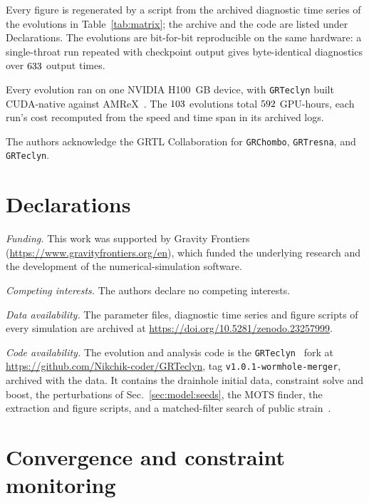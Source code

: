 \documentclass[twocolumn,floatfix,aps,prd,superscriptaddress,nofootinbib]{revtex4-2}
\makeatletter
\newcommand{\packfloatpages}{%
  \setlength{\@fptop}{0pt}%
  \setlength{\@fpsep}{12pt}%
  \setlength{\@fpbot}{0pt plus 1fil}%
  \setlength{\@dblfptop}{0pt}%
  \setlength{\@dblfpsep}{12pt}%
  \setlength{\@dblfpbot}{0pt plus 1fil}%
}
\makeatother
\begin{document}
Every figure is regenerated by a script from the archived diagnostic time series of the evolutions in Table~\ref{tab:matrix}; the archive and the code are listed under Declarations. The evolutions are bit-for-bit reproducible on the same hardware: a single-throat run repeated with checkpoint output gives byte-identical diagnostics over $633$ output times.

Every evolution ran on one NVIDIA H100 \clmDetMemDevice\,GB device, with \texttt{GRTeclyn} built CUDA-native against AMReX~\clmDetAmrexVersion. The $103$ evolutions total $592$ GPU-hours, each run's cost recomputed from the speed and time span in its archived logs.

\begin{acknowledgments}
The authors acknowledge the GRTL Collaboration for \texttt{GRChombo}, \texttt{GRTresna},
and \texttt{GRTeclyn}.
\end{acknowledgments}

\section*{Declarations}
\textit{Funding.} This work was supported by Gravity Frontiers (\url{https://www.gravityfrontiers.org/en}), which funded the underlying research and the development of the numerical-simulation software.

\textit{Competing interests.} The authors declare no competing interests.

\textit{Data availability.} The parameter files, diagnostic time series and figure scripts of every simulation are archived at \url{https://doi.org/10.5281/zenodo.23257999}.

\textit{Code availability.} The evolution and analysis code is the \texttt{GRTeclyn}~\cite{grteclyn} fork at \url{https://github.com/Nikchik-coder/GRTeclyn}, tag \texttt{v1.0.1-wormhole-merger}, archived with the data. It contains the drainhole initial data, constraint solve and boost, the perturbations of Sec.~\ref{sec:model:seeds}, the MOTS finder, the extraction and figure scripts, and a matched-filter search of public strain~\cite{gwosc,pycbc}.

\FloatBarrier

\appendix

\section{Convergence and constraint monitoring}
\label{app:health}
\packfloatpages
\end{document}
